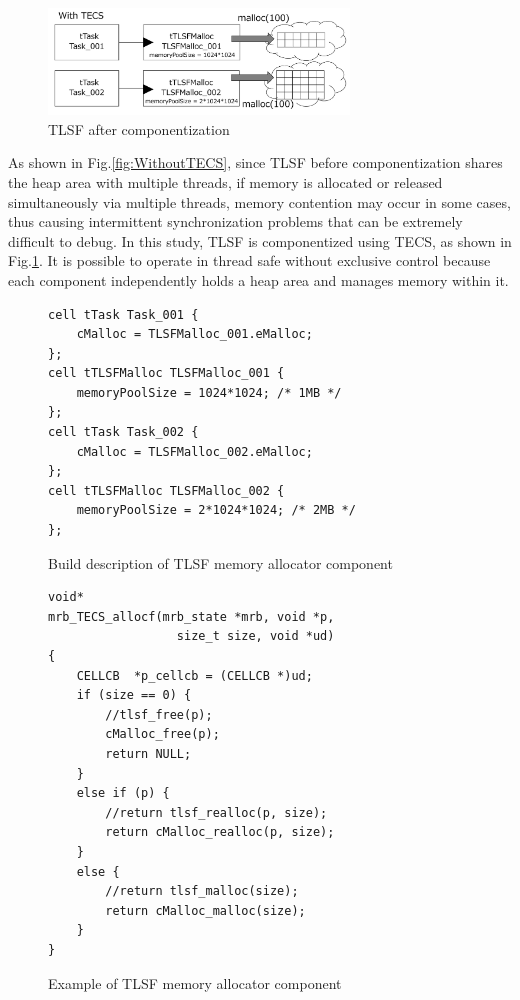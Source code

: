 \documentclass[JIP]{ipsj_v2/UTF8/ipsj}
\begin{document}
\begin{figure}[t]
    \centering
    \includegraphics[width=8cm,clip]{figure/WithTECS.pdf}
    \caption{TLSF after componentization}
    \label{fig:WithTECS}
\end{figure}

As shown in Fig.\ref{fig:WithoutTECS}, since TLSF before componentization shares the heap area with multiple threads, if memory is allocated or released simultaneously via multiple threads, memory contention may occur in some cases, thus causing intermittent synchronization problems that can be extremely difficult to debug.
In this study, TLSF is componentized using TECS, as shown in Fig.\ref{fig:WithTECS}.
It is possible to operate in thread safe without exclusive control because each component independently holds a heap area and manages memory within it. 

\begin{figure}[t]
\centering
\begin{lstlisting}
cell tTask Task_001 {
    cMalloc = TLSFMalloc_001.eMalloc;
};
cell tTLSFMalloc TLSFMalloc_001 {
    memoryPoolSize = 1024*1024; /* 1MB */
};
cell tTask Task_002 {
    cMalloc = TLSFMalloc_002.eMalloc;
};
cell tTLSFMalloc TLSFMalloc_002 {
    memoryPoolSize = 2*1024*1024; /* 2MB */
};
\end{lstlisting}
\caption{Build description of TLSF memory allocator component}
\label{src:TLSFBuild}
\end{figure}


\begin{figure}[t]
\centering
\begin{lstlisting}
void*
mrb_TECS_allocf(mrb_state *mrb, void *p, 
                  size_t size, void *ud)
{
    CELLCB	*p_cellcb = (CELLCB *)ud;
    if (size == 0) {
        //tlsf_free(p);
        cMalloc_free(p);
        return NULL;
    }
    else if (p) {
        //return tlsf_realloc(p, size);
        return cMalloc_realloc(p, size);
    }
    else {
        //return tlsf_malloc(size);
        return cMalloc_malloc(size);
    }
}
\end{lstlisting}
\caption{Example of TLSF memory allocator component}  
\label{src:TLSFC}
\end{figure}
\end{document}
